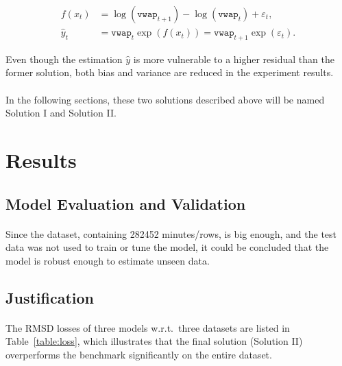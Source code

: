 \documentclass[12pt, letterpaper]{article}
\begin{document}
\begin{align*}
    f(x_t) & =\log(\mathtt{vwap}_{t+1})-\log(\mathtt{vwap}_t)+\varepsilon_t, \\
    \hat y_t & =\mathtt{vwap}_t\exp(f(x_t))=\mathtt{vwap}_{t+1}\exp(\varepsilon_t).
\end{align*}

Even though the estimation \(\hat y\) is more vulnerable to a higher residual than the former solution, both bias and variance are reduced in the experiment results.

\paragraph{}
In the following sections, these two solutions described above will be named Solution I and Solution II\@.

\section{Results} %

\subsection{Model Evaluation and Validation}

\paragraph{}
Since the dataset, containing 282452 minutes/rows, is big enough, and the test data was not used to train or tune the model, it could be concluded that the model is robust enough to estimate unseen data.

\subsection{Justification}

\paragraph{}
The RMSD losses of three models w.r.t.\ three datasets are listed in Table~\ref{table:loss}, which illustrates that the final solution (Solution II) overperforms the benchmark significantly on the entire dataset.
\end{document}
